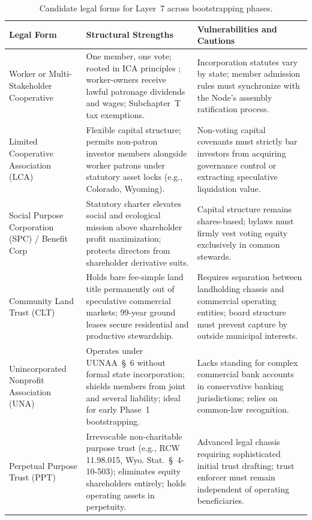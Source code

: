 \begin{table}[htbp]
\centering
\small
\begin{tabular}{|p{}|p{}|p{}|}
\hline
\textbf{Legal Form} & \textbf{Structural Strengths} & \textbf{Vulnerabilities and Cautions} \\
\hline
Worker or Multi-Stakeholder Cooperative & One member, one vote; rooted in ICA principles \parencite{ica1995}; worker-owners receive lawful patronage dividends and wages; Subchapter~T tax exemptions. & Incorporation statutes vary by state; member admission rules must synchronize with the Node's assembly ratification process. \\
\hline
Limited Cooperative Association (LCA) & Flexible capital structure; permits non-patron investor members alongside worker patrons under statutory asset locks (e.g., Colorado, Wyoming). & Non-voting capital covenants must strictly bar investors from acquiring governance control or extracting speculative liquidation value. \\
\hline
Social Purpose Corporation (SPC) / Benefit Corp & Statutory charter elevates social and ecological mission above shareholder profit maximization; protects directors from shareholder derivative suits. & Capital structure remains shares-based; bylaws must firmly vest voting equity exclusively in common stewards. \\
\hline
Community Land Trust (CLT) & Holds bare fee-simple land title permanently out of speculative commercial markets; 99-year ground leases secure residential and productive stewardship. & Requires separation between landholding chassis and commercial operating entities; board structure must prevent capture by outside municipal interests. \\
\hline
Unincorporated Nonprofit Association (UNA) & Operates under UUNAA~\S~6 without formal state incorporation; shields members from joint and several liability; ideal for early Phase~1 bootstrapping. & Lacks standing for complex commercial bank accounts in conservative banking jurisdictions; relies on common-law recognition. \\
\hline
Perpetual Purpose Trust (PPT) & Irrevocable non-charitable purpose trust (e.g., RCW 11.98.015, Wyo. Stat.~\S~4-10-503); eliminates equity shareholders entirely; holds operating assets in perpetuity. & Advanced legal chassis requiring sophisticated initial trust drafting; trust enforcer must remain independent of operating beneficiaries. \\
\hline
\end{tabular}
\caption{Candidate legal forms for Layer~7 across bootstrapping phases.}
\label{tab:l7-forms}
\end{table}

